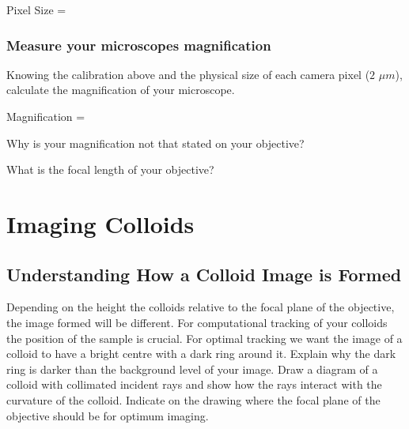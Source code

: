 \documentclass[12pt,a4paper,twoside]{article}
\begin{document}
Pixel Size =
\vspace{2cm}
\subsubsection{Measure your microscopes magnification}

Knowing the calibration above and the physical size of each camera pixel ($2$ $\mu m $), calculate the magnification of your microscope.

Magnification =

\vspace{2cm}
Why is your magnification not that stated on your objective?
\vspace{2cm}

What is the focal length of your objective?
\vspace{2cm}

\newpage
\section{Imaging Colloids}

\subsection{Understanding How a Colloid Image is Formed}

Depending on the height the colloids relative to the focal plane of the objective, the image formed will be different. For computational tracking of your colloids the position of the sample is crucial. For optimal tracking we want the image of a colloid to have a bright centre with a dark ring around it. Explain why the dark ring is darker than the background level of your image. Draw a diagram of a colloid with collimated incident rays and show how the rays interact with the curvature of the colloid. Indicate on the drawing where the focal plane of the objective should be for optimum imaging.
\vspace{2cm}

\end{document}

